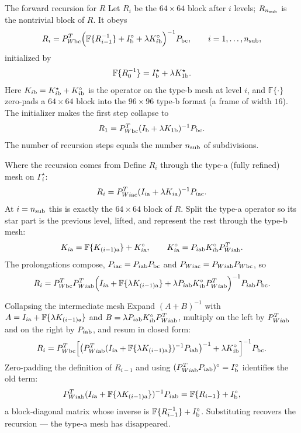 \documentclass[aspectratio=169,11pt]{beamer}
\begin{document}
\begin{frame}{The forward recursion for $R$}
\small
Let $R_i$ be the $64\times64$ block after $i$ levels; $R_{n_{\rm sub}}$ is the
nontrivial block of $R$.  It obeys
\[
  R_i=P_{W{\rm bc}}^T
  \Bigl(\mathbb{F}\{R_{i-1}^{-1}\}+I_{\rm b}^\circ+\lambda K^\circ_{i{\rm b}}\Bigr)^{-1}
  P_{\rm bc},
  \qquad i=1,\ldots,n_{\rm sub},
\]
initialized by
\[
  \mathbb{F}\{R_0^{-1}\}=I_{\rm b}^\star+\lambda K^\star_{1{\rm b}}.
\]
Here $K_{i{\rm b}}=K^\star_{i{\rm b}}+K^\circ_{i{\rm b}}$ is the operator on the
type-\textsf{b} mesh at level $i$, and $\mathbb{F}\{\cdot\}$ zero-pads a
$64\times64$ block into the $96\times96$ type-\textsf{b} format (a frame of width
$16$).  The initializer makes the first step collapse to
\[
  R_1=P_{W{\rm bc}}^T(I_{\rm b}+\lambda K_{1{\rm b}})^{-1}P_{\rm bc}.
\]
The number of recursion steps equals the number $n_{\rm sub}$ of subdivisions.
\end{frame}

\begin{frame}{Where the recursion comes from}
\small
Define $R_i$ through the type-\textsf{a} (fully refined) mesh on $\Gamma_i^\star$:
\[
  R_i=P_{Wi{\rm ac}}^T(I_{i{\rm a}}+\lambda K_{i{\rm a}})^{-1}P_{i{\rm ac}}.
\]
At $i=n_{\rm sub}$ this is exactly the $64\times64$ block of $R$.  Split the
type-\textsf{a} operator so its star part is the previous level, lifted, and
represent the rest through the type-\textsf{b} mesh:
\[
  K_{i{\rm a}}=\mathbb{F}\{K_{(i-1){\rm a}}\}+K^\circ_{i{\rm a}},
  \qquad
  K^\circ_{i{\rm a}}=P_{i{\rm ab}}K^\circ_{i{\rm b}}P_{Wi{\rm ab}}^T .
\]
The prolongations compose, $P_{i{\rm ac}}=P_{i{\rm ab}}P_{\rm bc}$ and
$P_{Wi{\rm ac}}=P_{Wi{\rm ab}}P_{W{\rm bc}}$, so
\[
  R_i=P_{W{\rm bc}}^T P_{Wi{\rm ab}}^T
  \Bigl(I_{i{\rm a}}+\mathbb{F}\{\lambda K_{(i-1){\rm a}}\}
  +\lambda P_{i{\rm ab}}K^\circ_{i{\rm b}}P_{Wi{\rm ab}}^T\Bigr)^{-1}
  P_{i{\rm ab}}P_{\rm bc}.
\]
\end{frame}

\begin{frame}{Collapsing the intermediate mesh}
\small
Expand $(A+B)^{-1}$ with $A=I_{i{\rm a}}+\mathbb{F}\{\lambda K_{(i-1){\rm a}}\}$
and $B=\lambda P_{i{\rm ab}}K^\circ_{i{\rm b}}P_{Wi{\rm ab}}^T$, multiply on the
left by $P_{Wi{\rm ab}}^T$ and on the right by $P_{i{\rm ab}}$, and resum in
closed form:
\[
  R_i=P_{W{\rm bc}}^T
  \Bigl[\bigl(P_{Wi{\rm ab}}^T(I_{i{\rm a}}+\mathbb{F}\{\lambda K_{(i-1){\rm a}}\})^{-1}P_{i{\rm ab}}\bigr)^{-1}
  +\lambda K^\circ_{i{\rm b}}\Bigr]^{-1}P_{\rm bc}.
\]
Zero-padding the definition of $R_{i-1}$ and using
$(P_{Wi{\rm ab}}^T P_{i{\rm ab}})^\circ=I_{\rm b}^\circ$ identifies the old term:
\[
  P_{Wi{\rm ab}}^T(I_{i{\rm a}}+\mathbb{F}\{\lambda K_{(i-1){\rm a}}\})^{-1}P_{i{\rm ab}}
  =\mathbb{F}\{R_{i-1}\}+I_{\rm b}^\circ,
\]
a block-diagonal matrix whose inverse is
$\mathbb{F}\{R_{i-1}^{-1}\}+I_{\rm b}^\circ$.  Substituting recovers the
recursion --- the type-\textsf{a} mesh has disappeared.
\end{frame}
\end{document}
